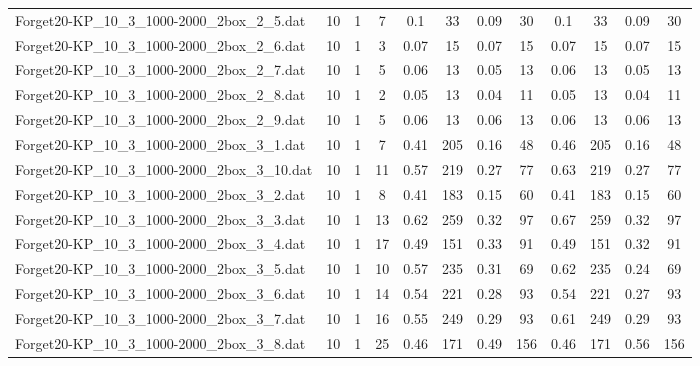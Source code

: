 \begin{sidewaystable}[!ht]
{\begin{tabular}{lccccccccccc}
Forget20-KP\_10\_3\_1000-2000\_2box\_2\_5.dat & 10 & 1 & 7 & 0.1 & 33 &  \textcolor{blue2}{0.09} & 30 & 0.1 & 33 &  \textcolor{blue2}{0.09} & 30 \\
Forget20-KP\_10\_3\_1000-2000\_2box\_2\_6.dat & 10 & 1 & 3 &  \textcolor{blue2}{0.07} & 15 &  \textcolor{blue2}{0.07} & 15 &  \textcolor{blue2}{0.07} & 15 &  \textcolor{blue2}{0.07} & 15 \\
Forget20-KP\_10\_3\_1000-2000\_2box\_2\_7.dat & 10 & 1 & 5 & 0.06 & 13 &  \textcolor{blue2}{0.05} & 13 & 0.06 & 13 &  \textcolor{blue2}{0.05} & 13 \\
Forget20-KP\_10\_3\_1000-2000\_2box\_2\_8.dat & 10 & 1 & 2 & 0.05 & 13 &  \textcolor{blue2}{0.04} & 11 & 0.05 & 13 &  \textcolor{blue2}{0.04} & 11 \\
Forget20-KP\_10\_3\_1000-2000\_2box\_2\_9.dat & 10 & 1 & 5 &  \textcolor{blue2}{0.06} & 13 &  \textcolor{blue2}{0.06} & 13 &  \textcolor{blue2}{0.06} & 13 &  \textcolor{blue2}{0.06} & 13 \\
Forget20-KP\_10\_3\_1000-2000\_2box\_3\_1.dat & 10 & 1 & 7 & 0.41 & 205 &  \textcolor{blue2}{0.16} & 48 & 0.46 & 205 &  \textcolor{blue2}{0.16} & 48 \\
Forget20-KP\_10\_3\_1000-2000\_2box\_3\_10.dat & 10 & 1 & 11 & 0.57 & 219 &  \textcolor{blue2}{0.27} & 77 & 0.63 & 219 &  \textcolor{blue2}{0.27} & 77 \\
Forget20-KP\_10\_3\_1000-2000\_2box\_3\_2.dat & 10 & 1 & 8 & 0.41 & 183 &  \textcolor{blue2}{0.15} & 60 & 0.41 & 183 &  \textcolor{blue2}{0.15} & 60 \\
Forget20-KP\_10\_3\_1000-2000\_2box\_3\_3.dat & 10 & 1 & 13 & 0.62 & 259 &  \textcolor{blue2}{0.32} & 97 & 0.67 & 259 &  \textcolor{blue2}{0.32} & 97 \\
Forget20-KP\_10\_3\_1000-2000\_2box\_3\_4.dat & 10 & 1 & 17 & 0.49 & 151 & 0.33 & 91 & 0.49 & 151 &  \textcolor{blue2}{0.32} & 91 \\
Forget20-KP\_10\_3\_1000-2000\_2box\_3\_5.dat & 10 & 1 & 10 & 0.57 & 235 & 0.31 & 69 & 0.62 & 235 &  \textcolor{blue2}{0.24} & 69 \\
Forget20-KP\_10\_3\_1000-2000\_2box\_3\_6.dat & 10 & 1 & 14 & 0.54 & 221 & 0.28 & 93 & 0.54 & 221 &  \textcolor{blue2}{0.27} & 93 \\
Forget20-KP\_10\_3\_1000-2000\_2box\_3\_7.dat & 10 & 1 & 16 & 0.55 & 249 &  \textcolor{blue2}{0.29} & 93 & 0.61 & 249 &  \textcolor{blue2}{0.29} & 93 \\
Forget20-KP\_10\_3\_1000-2000\_2box\_3\_8.dat & 10 & 1 & 25 &  \textcolor{blue2}{0.46} & 171 & 0.49 & 156 &  \textcolor{blue2}{0.46} & 171 & 0.56 & 156 \\

\end{tabular}}
\end{sidewaystable}
